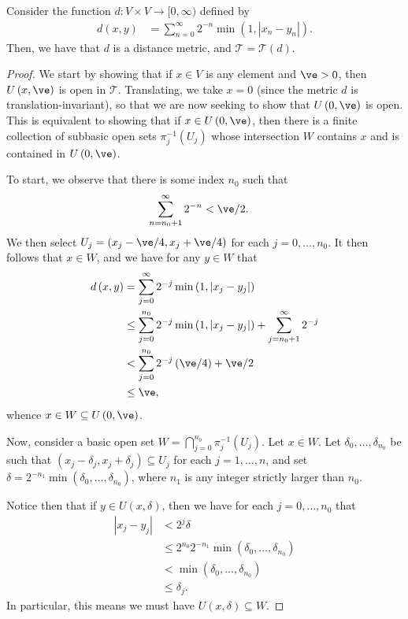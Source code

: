 \documentclass[10pt]{mypackage}
\begin{document}
\begin{enumerate}[(i)]
    Consider the function $d\colon V\times V \rightarrow [0,\infty)$ defined by
    \begin{align*}
      d\left( x,y \right) &= \sum_{n=0}^{\infty} 2^{-n} \min\left( 1, \left\vert x_n-y_n \right\vert \right).
    \end{align*}
    Then, we have that $d$ is a distance metric, and $ \mathcal{T} = \mathcal{T}\left( d \right) $.
    \begin{proof}
      We start by showing that if $x\in V$ is any element and $\ve > 0$, then $U\left( x,\ve \right)$ is open in $ \mathcal{T} $. Translating, we take $x = 0$ (since the metric $d$ is translation-invariant), so that we are now seeking to show that $U\left( 0,\ve \right)$ is open. This is equivalent to showing that if $x\in U\left( 0,\ve \right)$, then there is a finite collection of subbasic open sets $\pi_j^{-1}\left( U_j \right)$ whose intersection $W$ contains $x$ and is contained in $U\left( 0,\ve \right)$.

      To start, we observe that there is some index $n_0$ such that
      \begin{align*}
        \sum_{n=n_0 + 1}^{\infty} 2^{-n} &< \ve/2.
      \end{align*}
      We then select $U_j = \left( x_j-\ve/4,x_j+\ve/4 \right)$ for each $j=0,\dots,n_0$. It then follows that $x\in W$, and we have for any $y\in W$ that
      \begin{align*}
        d\left( x,y \right) &= \sum_{j=0}^{\infty} 2^{-j}\min\left( 1,\left\vert x_j-y_j \right\vert \right)\\
                            &\leq \sum_{j=0}^{n_0} 2^{-j}\min\left( 1,\left\vert x_j-y_j \right\vert \right) + \sum_{j=n_0 + 1}^{\infty} 2^{-j}\\
                            &< \sum_{j=0}^{n_0} 2^{-j} \left( \ve/4 \right) + \ve/2\\
                            &\leq \ve,
      \end{align*}
      whence $x\in W\subseteq U\left( 0,\ve \right)$.

      Now, consider a basic open set $W = \bigcap_{j=0}^{n_0}\pi_j^{-1}\left( U_j \right)$. Let $x\in W$. Let $\delta_0,\dots,\delta_{n_0}$ be such that $\left( x_j-\delta_j,x_j + \delta_j \right)\subseteq U_j$ for each $j=1,\dots,n$, and set $\delta = 2^{-n_1}\min\left( \delta_0,\dots,\delta_{n_0} \right)$, where $n_1$ is any integer strictly larger than $n_0$.

      Notice then that if $y\in U\left( x,\delta \right)$, then we have for each $j=0,\dots,n_0$ that
      \begin{align*}
        \left\vert x_j - y_j \right\vert &< 2^{j}\delta\\
                                         &\leq 2^{n_0}2^{-n_1}\min\left( \delta_0,\dots,\delta_{n_0} \right)\\
                                         &< \min\left( \delta_0,\dots,\delta_{n_0} \right)\\
                                         &\leq \delta_j.
      \end{align*}
      In particular, this means we must have $U\left( x,\delta \right) \subseteq W$.


\end{proof}
\end{enumerate}
\end{document}
